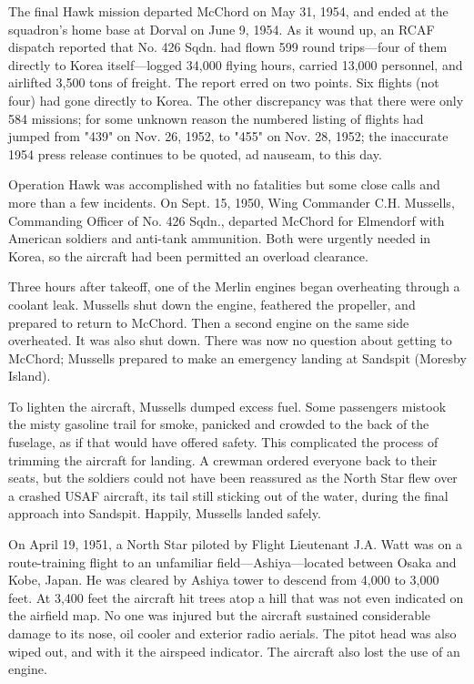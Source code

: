 The final Hawk mission departed McChord on May 31, 1954, and ended at
the squadron's home base at Dorval on June 9, 1954. As it wound up, an
RCAF dispatch reported that No. 426 Sqdn. had flown 599 round
trips---four of them directly to Korea itself---logged 34,000 flying
hours, carried 13,000 personnel, and airlifted 3,500 tons of
freight. The report erred on two points. Six flights (not four) had
gone directly to Korea. The other discrepancy was that there were
only 584 missions; for some unknown reason the numbered listing of
flights had jumped from "439" on Nov. 26, 1952, to "455" on Nov. 28,
1952; the inaccurate 1954 press release continues to be quoted, ad
nauseam, to this day.

Operation Hawk was accomplished with no fatalities but some close
calls and more than a few incidents. On Sept. 15, 1950, Wing Commander
C.H. Mussells, Commanding Officer of No. 426 Sqdn., departed McChord
for Elmendorf with American soldiers and anti-tank ammunition. Both
were urgently needed in Korea, so the aircraft had been permitted an
overload clearance.

Three hours after takeoff, one of the Merlin engines began overheating
through a coolant leak. Mussells shut down the engine, feathered the
propeller, and prepared to return to McChord. Then a second engine on
the same side overheated. It was also shut down. There was now no
question about getting to McChord; Mussells prepared to make an
emergency landing at Sandspit (Moresby Island).

To lighten the aircraft, Mussells dumped excess fuel. Some passengers
mistook the misty gasoline trail for smoke, panicked and crowded to
the back of the fuselage, as if that would have offered safety. This
complicated the process of trimming the aircraft for landing. A
crewman ordered everyone back to their seats, but the soldiers could
not have been reassured as the North Star flew over a crashed USAF
aircraft, its tail still sticking out of the water, during the final
approach into Sandspit. Happily, Mussells landed safely.

On April 19, 1951, a North Star piloted by Flight Lieutenant J.A. Watt
was on a route-training flight to an unfamiliar field---Ashiya---located
between Osaka and Kobe, Japan. He was cleared by Ashiya tower to
descend from 4,000 to 3,000 feet. At 3,400 feet the aircraft hit trees
atop a hill that was not even indicated on the airfield map. No one
was injured but the aircraft sustained considerable damage to its
nose, oil cooler and exterior radio aerials. The pitot head was also
wiped out, and with it the airspeed indicator. The aircraft also lost
the use of an engine.

